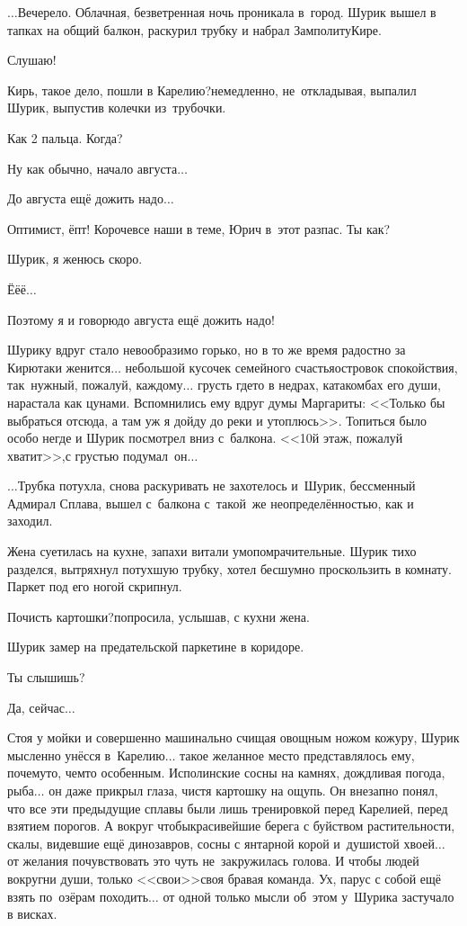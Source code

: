 {	\hspace{1cm}
	
	$\ldots$Вечерело. Облачная, безветренная ночь проникала в~город. Шурик вышел в тапках на общий балкон, раскурил трубку и набрал Замполиту\mdash Кире.
	
	\diagdash Слушаю!
	
	\diagdash Кирь, такое дело, пошли в Карелию?\mdash немедленно, не~откладывая, выпалил Шурик, выпустив колечки из~трубочки.
	
	\diagdash Как 2 пальца. Когда?
	
	\diagdash Ну как обычно, начало августа$\ldots$
	
	\diagdash До августа ещё дожить надо$\ldots$
	
	\diagdash Оптимист, ёпт! Короче\mdash все наши в теме, Юрич в~этот раз\mdash пас. Ты как?
	
	\diagdash Шурик, я женюсь скоро.
	
	\diagdash Ё\sdash ё\sdash ё$\ldots$
	
	\diagdash Поэтому я и говорю\mdash до августа ещё дожить надо!
	
	Шурику вдруг стало невообразимо горько, но в то же время радостно за Кирю\mdash таки женится$\ldots$ небольшой кусочек семейного счастья\mdash островок спокойствия, так~нужный, пожалуй, каждому$\ldots$ грусть где\sdash то в недрах, катакомбах его души, нарастала как цунами. Вспомнились ему вдруг думы Маргариты: <<Только бы выбраться отсюда, а там уж я дойду до реки и утоплюсь>>\cite{МастерМаргарита}. Топиться было особо негде и Шурик посмотрел вниз с~балкона. <<10\sdash й этаж, пожалуй хватит>>,\mdash с грустью подумал~он$\ldots$
	
	$\ldots$Трубка потухла, снова раскуривать не захотелось и~Шурик, бессменный Адмирал Сплава, вышел с~балкона с~такой~же неопределённостью, как и заходил.
	
	Жена суетилась на кухне, запахи витали умопомрачительные. Шурик тихо разделся, вытряхнул потухшую трубку, хотел бесшумно проскользить в комнату. Паркет под его ногой скрипнул. 
	
	\diagdash Почисть картошки?\mdash попросила, услышав, с кухни жена.
	
	Шурик замер на предательской паркетине в коридоре.
	
	\diagdash Ты слышишь?
	
	\diagdash Да, сейчас$\ldots$
	
	Стоя у мойки и совершенно машинально счищая овощным ножом кожуру, Шурик мысленно унёсся в~Карелию$\ldots$ такое желанное место представлялось ему, почему\sdash то, чем\sdash то особенным. Исполинские сосны на камнях, дождливая погода, рыба$\ldots$ он даже прикрыл глаза, чистя картошку на ощупь. Он внезапно понял, что все эти предыдущие сплавы были лишь тренировкой перед Карелией, перед взятием порогов. А вокруг чтобы\mdash красивейшие берега с буйством растительности, скалы, видевшие ещё динозавров, сосны с янтарной корой и~душистой хвоей$\ldots$ от желания почувствовать это чуть не~закружилась голова. И чтобы людей вокруг\mdash ни души, только <<свои>>\mdash своя бравая команда. Ух, парус с собой ещё взять по~озёрам походить$\ldots$ от одной только мысли об~этом у~Шурика застучало в висках.
	
}
